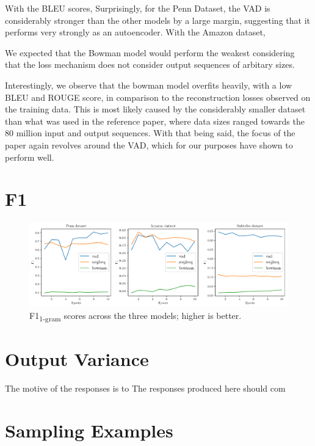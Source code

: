 \documentclass[12pt,twoside]{report}
\begin{document}
With the BLEU scores, Surprisingly, for the Penn Dataset, the VAD is considerably stronger than the other models by a large margin, suggesting that it performs very strongly as an autoencoder. With the Amazon dataset, 


We expected that the Bowman model would perform the weakest considering that the loss mechanism does not consider output sequences of arbitary sizes.

Interestingly, we observe that the bowman model overfits heavily, with a low BLEU and ROUGE score, in comparison to the reconstruction losses observed on the training data. This is most likely caused by the considerably smaller dataset than what was used in the reference paper, where data sizes ranged towards the 80 million input and output sequences. With that being said, the focus of the paper again revolves around the VAD, which for our purposes have shown to perform well.

\section{F1}

\begin{figure}[!ht]
	\centering
	\includegraphics[width=150mm]{results/f1.pdf}
	\caption{F1\textsubscript{1-gram} scores across the three models; higher is better.\label{r:f1}}
  \end{figure}


\section{Output Variance}

The motive of the responses is to 
The responses produced here should com

\section{Sampling Examples}
\end{document}
